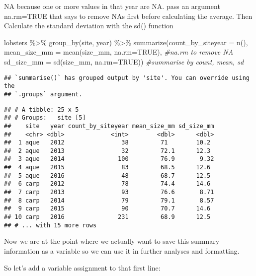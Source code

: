 \documentclass[
]{article}
\newenvironment{Shaded}{\begin{snugshade}}{\end{snugshade}}
\newcommand{\AttributeTok}[1]{\textcolor[rgb]{0.77,0.63,0.00}{#1}}
\newcommand{\CommentTok}[1]{\textcolor[rgb]{0.56,0.35,0.01}{\textit{#1}}}
\newcommand{\ConstantTok}[1]{\textcolor[rgb]{0.00,0.00,0.00}{#1}}
\newcommand{\FunctionTok}[1]{\textcolor[rgb]{0.00,0.00,0.00}{#1}}
\newcommand{\NormalTok}[1]{#1}
\newcommand{\SpecialCharTok}[1]{\textcolor[rgb]{0.00,0.00,0.00}{#1}}
\begin{document}
NA because one or more values in that year are NA. pass an argument
na.rm=TRUE that says to remove NAs first before calculating the average.
Then Calculate the standard deviation with the sd() function

\begin{Shaded}
\begin{Highlighting}[]
\NormalTok{lobsters }\SpecialCharTok{\%\textgreater{}\%}
  \FunctionTok{group\_by}\NormalTok{(site, year) }\SpecialCharTok{\%\textgreater{}\%}
  \FunctionTok{summarize}\NormalTok{(}\AttributeTok{count\_by\_siteyear =}  \FunctionTok{n}\NormalTok{(), }
            \AttributeTok{mean\_size\_mm =} \FunctionTok{mean}\NormalTok{(size\_mm, }\AttributeTok{na.rm=}\ConstantTok{TRUE}\NormalTok{), }\CommentTok{\#na.rm to remove NA}
            \AttributeTok{sd\_size\_mm =} \FunctionTok{sd}\NormalTok{(size\_mm, }\AttributeTok{na.rm=}\ConstantTok{TRUE}\NormalTok{)) }\CommentTok{\#summarise by count, mean, sd}
\end{Highlighting}
\end{Shaded}

\begin{verbatim}
## `summarise()` has grouped output by 'site'. You can override using the
## `.groups` argument.
\end{verbatim}

\begin{verbatim}
## # A tibble: 25 x 5
## # Groups:   site [5]
##    site   year count_by_siteyear mean_size_mm sd_size_mm
##    <chr> <dbl>             <int>        <dbl>      <dbl>
##  1 aque   2012                38         71        10.2 
##  2 aque   2013                32         72.1      12.3 
##  3 aque   2014               100         76.9       9.32
##  4 aque   2015                83         68.5      12.6 
##  5 aque   2016                48         68.7      12.5 
##  6 carp   2012                78         74.4      14.6 
##  7 carp   2013                93         76.6       8.71
##  8 carp   2014                79         79.1       8.57
##  9 carp   2015                90         70.7      14.6 
## 10 carp   2016               231         68.9      12.5 
## # ... with 15 more rows
\end{verbatim}

Now we are at the point where we actually want to save this summary
information as a variable so we can use it in further analyses and
formatting.

So let's add a variable assignment to that first line:
\end{document}
